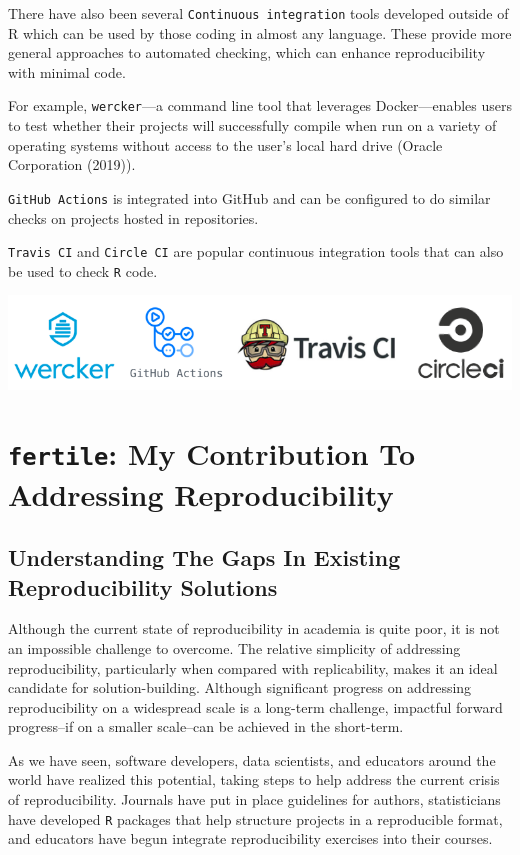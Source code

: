 \documentclass[12pt,twoside]{reedthesis}
\begin{document}
There have also been several \texttt{Continuous\ integration} tools
developed outside of R which can be used by those coding in almost any
language. These provide more general approaches to automated checking,
which can enhance reproducibility with minimal code.

For example, \texttt{wercker}---a command line tool that leverages
Docker---enables users to test whether their projects will successfully
compile when run on a variety of operating systems without access to the
user's local hard drive (Oracle Corporation (2019)).

\texttt{GitHub\ Actions} is integrated into GitHub and can be configured
to do similar checks on projects hosted in repositories.

\texttt{Travis\ CI} and \texttt{Circle\ CI} are popular continuous
integration tools that can also be used to check \texttt{R} code.
\begin{center}\includegraphics[width=0.8\linewidth]{figure/ci-tools} \end{center}

\chapter{\texorpdfstring{\texttt{fertile}: My Contribution To Addressing
Reproducibility}{fertile: My Contribution To Addressing Reproducibility}}\label{my-solution}

\section{Understanding The Gaps In Existing Reproducibility
Solutions}\label{understanding-the-gaps-in-existing-reproducibility-solutions}

Although the current state of reproducibility in academia is quite poor,
it is not an impossible challenge to overcome. The relative simplicity
of addressing reproducibility, particularly when compared with
replicability, makes it an ideal candidate for solution-building.
Although significant progress on addressing reproducibility on a
widespread scale is a long-term challenge, impactful forward
progress--if on a smaller scale--can be achieved in the short-term.

As we have seen, software developers, data scientists, and educators
around the world have realized this potential, taking steps to help
address the current crisis of reproducibility. Journals have put in
place guidelines for authors, statisticians have developed \texttt{R}
packages that help structure projects in a reproducible format, and
educators have begun integrate reproducibility exercises into their
courses.
\end{document}
